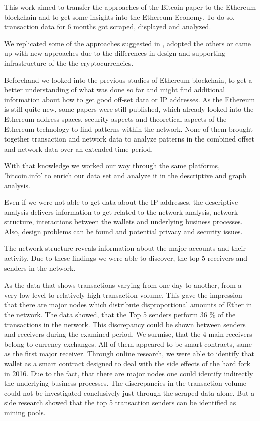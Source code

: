 This work aimed to transfer the approaches of the Bitcoin paper \cite{lischke2016analyzing} to the Ethereum blockchain and to get some insights into the Ethereum Economy. 
To do so, transaction data for 6 months got scraped, displayed and analyzed.

We replicated some of the approaches suggested in \cite{lischke2016analyzing}, adopted the others or came up with new approaches due to the differences in design and supporting infrastructure of the the cryptocurrencies.

Beforehand we looked into the previous studies of Ethereum blockchain, to get a better understanding of what was done so far and might find additional information about how to get good off-set data or IP addresses.
As the Ethereum is still quite new, some papers were still published, which already looked into the Ethereum address spaces, security aspects and theoretical aspects of the Ethereum technology to find patterns within the network.
None of them brought together transaction and network data to analyze patterns in the combined offset and network data over an extended time period.

With that knowledge we worked our way through the same platforms, 'bitcoin.info' to enrich our data set and analyze it in the descriptive and graph analysis.

Even if we were not able to get data about the IP addresses, the descriptive analysis delivers information to get related to the network analysis, network structure, interactions between the wallets and underlying business processes.
Also, design problems can be found and potential privacy and security issues.

The network structure reveals information about the major accounts and their activity. 
Due to these findings we were able to discover, the top 5 receivers and senders in the network.

As the data that shows transactions varying from one day to another, from a very low level to relatively high transaction volume.
This gave the impression that there are major nodes which distribute disproportional amounts of Ether in the network. 
The data showed, that the Top 5 senders perform 36 \% of the transactions in the network. 
This discrepancy could be shown between senders and receivers during the examined period. 
We surmise, that the 4 main receivers belong to currency exchanges. 
All of them appeared to be smart contracts, same as the first major receiver. 
Through online research, we were able to identify that wallet as a smart contract designed to deal with the side effects of the hard fork in 2016.
Due to the fact, that there are major nodes one could identify indirectly the underlying business processes. 
The discrepancies in the transaction volume could not be investigated conclusively just through the scraped data alone. 
But a side research showed that the top 5 transaction senders can be identified as mining pools.

